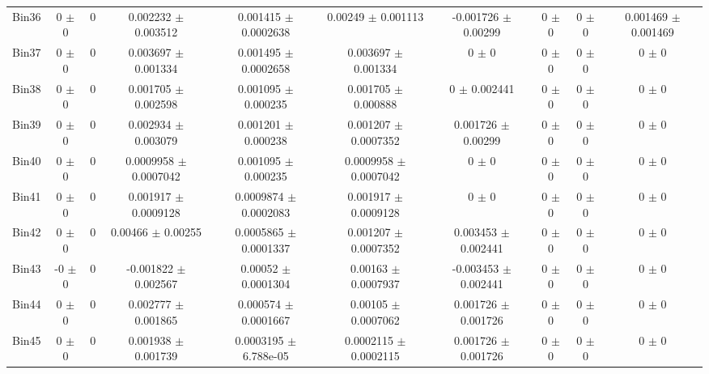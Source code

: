 \begin{tabular}{@{\extracolsep{4pt}}lccccccccc@{}}
     Bin36 & 0 $\pm$ 0 & 0 & 0.002232 $\pm$ 0.003512 & 0.001415 $\pm$ 0.0002638 & 0.00249 $\pm$ 0.001113 & -0.001726 $\pm$ 0.00299 & 0 $\pm$ 0 & 0 $\pm$ 0 & 0.001469 $\pm$ 0.001469 \\ 
     Bin37 & 0 $\pm$ 0 & 0 & 0.003697 $\pm$ 0.001334 & 0.001495 $\pm$ 0.0002658 & 0.003697 $\pm$ 0.001334 & 0 $\pm$ 0 & 0 $\pm$ 0 & 0 $\pm$ 0 & 0 $\pm$ 0 \\ 
     Bin38 & 0 $\pm$ 0 & 0 & 0.001705 $\pm$ 0.002598 & 0.001095 $\pm$ 0.000235 & 0.001705 $\pm$ 0.000888 & 0 $\pm$ 0.002441 & 0 $\pm$ 0 & 0 $\pm$ 0 & 0 $\pm$ 0 \\ 
     Bin39 & 0 $\pm$ 0 & 0 & 0.002934 $\pm$ 0.003079 & 0.001201 $\pm$ 0.000238 & 0.001207 $\pm$ 0.0007352 & 0.001726 $\pm$ 0.00299 & 0 $\pm$ 0 & 0 $\pm$ 0 & 0 $\pm$ 0 \\ 
     Bin40 & 0 $\pm$ 0 & 0 & 0.0009958 $\pm$ 0.0007042 & 0.001095 $\pm$ 0.000235 & 0.0009958 $\pm$ 0.0007042 & 0 $\pm$ 0 & 0 $\pm$ 0 & 0 $\pm$ 0 & 0 $\pm$ 0 \\ 
     Bin41 & 0 $\pm$ 0 & 0 & 0.001917 $\pm$ 0.0009128 & 0.0009874 $\pm$ 0.0002083 & 0.001917 $\pm$ 0.0009128 & 0 $\pm$ 0 & 0 $\pm$ 0 & 0 $\pm$ 0 & 0 $\pm$ 0 \\ 
     Bin42 & 0 $\pm$ 0 & 0 & 0.00466 $\pm$ 0.00255 & 0.0005865 $\pm$ 0.0001337 & 0.001207 $\pm$ 0.0007352 & 0.003453 $\pm$ 0.002441 & 0 $\pm$ 0 & 0 $\pm$ 0 & 0 $\pm$ 0 \\ 
     Bin43 & -0 $\pm$ 0 & 0 & -0.001822 $\pm$ 0.002567 & 0.00052 $\pm$ 0.0001304 & 0.00163 $\pm$ 0.0007937 & -0.003453 $\pm$ 0.002441 & 0 $\pm$ 0 & 0 $\pm$ 0 & 0 $\pm$ 0 \\ 
     Bin44 & 0 $\pm$ 0 & 0 & 0.002777 $\pm$ 0.001865 & 0.000574 $\pm$ 0.0001667 & 0.00105 $\pm$ 0.0007062 & 0.001726 $\pm$ 0.001726 & 0 $\pm$ 0 & 0 $\pm$ 0 & 0 $\pm$ 0 \\ 
     Bin45 & 0 $\pm$ 0 & 0 & 0.001938 $\pm$ 0.001739 & 0.0003195 $\pm$ 6.788e-05 & 0.0002115 $\pm$ 0.0002115 & 0.001726 $\pm$ 0.001726 & 0 $\pm$ 0 & 0 $\pm$ 0 & 0 $\pm$ 0 \\ 
\hline\hline
  \end{tabular}
